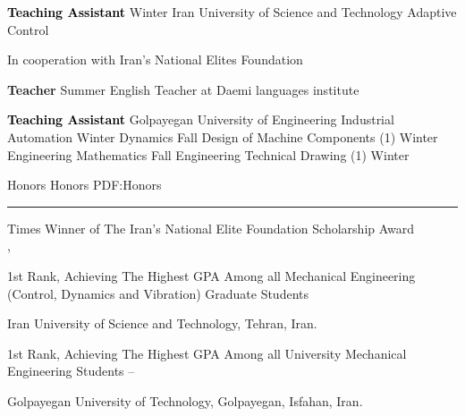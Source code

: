 \documentclass[letterpaper,MMMyyyy,nonstopmode]{ResumeTemplate}
\begin{document}
\begin{Body}

\Entry
\textcolor{black}{\textbf{Teaching Assistant}}
\hfill
Winter 
\Gap
\BulletItem
Iran University of Science and Technology
\newline
Adaptive Control
\begin{Detail}
	\qquad In cooperation with Iran's National Elites Foundation
\end{Detail}


\Entry
\vspace{5pt}
\textbf{Teacher}
\hfill
Summer 
\Gap
\BulletItem
English Teacher at Daemi languages institute


\Entry
\textcolor{black}{\textbf{Teaching Assistant}}
\Gap
\BulletItem
Golpayegan University of Engineering
\newline
Industrial Automation
\hfill
Winter 
\newline
Dynamics
\hfill
Fall 
\newline
Design of Machine Components (1)
\hfill
Winter 
\newline
Engineering Mathematics 
\hfill
Fall 
\newline
Engineering Technical Drawing (1) 
\hfill
Winter 

\Section
{Honors}
{Honors}
{PDF:Honors}
\textcolor{Forestg}{\vspace{0.05cm}\hrule height 0.1cm}\BigGap
\Gap
{} Times Winner of The Iran's National Elite Foundation Scholarship Award\\
 \hfill
{}, 
\vspace{5pt}

\Gap
\vspace{5pt}
\BulletItem
1st Rank, Achieving The Highest GPA Among all Mechanical Engineering (Control, Dynamics and Vibration) Graduate Students
\hfill
{}
\begin{Detail}
	\Item
	Iran University of Science and Technology, Tehran, Iran.
\end{Detail}

\Gap
\vspace{5pt}
\BulletItem
1st Rank, Achieving The Highest GPA Among all University Mechanical Engineering Students
\hfill
{} -- 
\begin{Detail}
	\Item
	Golpayegan University of Technology, Golpayegan, Isfahan, Iran.
\end{Detail}


\end{Body}
\end{document}
